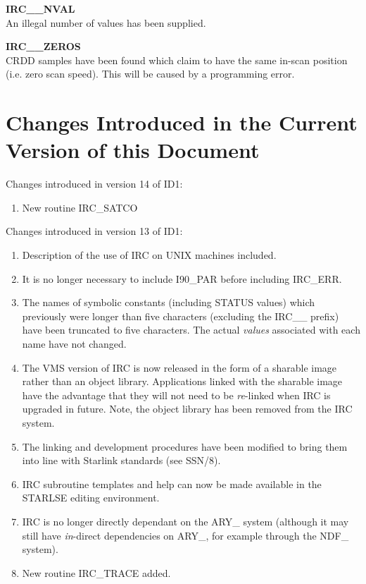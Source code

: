 \begin{description}
\item {\bf IRC\_\_NVAL      }\\
An illegal number of values has been supplied.

\item {\bf IRC\_\_ZEROS     }\\
CRDD samples have been found which claim to have the same in-scan position 
(i.e. zero scan speed). This will be caused by a programming error.

\end{description}

\section {Changes Introduced in the Current Version of this Document}
\label {SEC:CHANGES}

Changes introduced in version 14 of ID1:
\begin {enumerate}
\item New routine IRC\_SATCO
\end {enumerate}

Changes introduced in version 13 of ID1:
\begin {enumerate}
\item Description of the use of IRC on UNIX machines included.
\item It is no longer necessary to include I90\_PAR before including
IRC\_ERR.
\item The names of symbolic constants (including STATUS values) which previously
were longer than five characters (excluding the IRC\_\_ prefix) have been
truncated to five characters. The actual {\em values} associated with each name 
have not changed.
\item The VMS version of IRC is now released in the form of a sharable image 
rather than an object library. Applications linked with the sharable image have 
the advantage that they will not need to be {\em re}-linked when IRC is upgraded 
in future. Note, the object library has been removed from the IRC system.
\item The linking and development procedures have been modified to bring them 
into line with Starlink standards (see SSN/8).
\item IRC subroutine templates and help can now be made available in the STARLSE
editing environment.
\item IRC is no longer directly dependant on the ARY\_ system (although it may
still have {\em in}-direct dependencies on ARY\_, for example through the
NDF\_ system).
\item New routine IRC\_TRACE added.

\end {enumerate}


